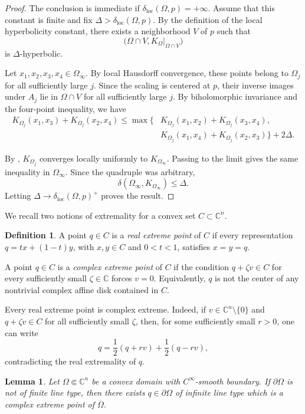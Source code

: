 \documentclass[11pt]{article}
\newtheorem{lemma}[theorem]{Lemma}
\theoremstyle{definition}
\newtheorem{definition}[theorem]{Definition}
\newcommand{\C}{\mathbb{C}}
\begin{document}
\begin{proof}
	The conclusion is immediate if
	\(\delta_{\mathrm{loc}}(\Omega,p)=+\infty\).
	Assume that this constant is finite and fix
	\(\Delta>\delta_{\mathrm{loc}}(\Omega,p)\).
	By the definition of the local hyperbolicity constant, there exists a
	neighborhood \(V\) of \(p\) such that
	\[
	\bigl(
	\Omega\cap V,
	\left.K_\Omega\right|_{\Omega\cap V}
	\bigr)
	\]
	is \(\Delta\)-hyperbolic.
	
	Let \(x_1,x_2,x_3,x_4\in\Omega_\infty\).  By local Hausdorff
	convergence, these points belong to \(\Omega_j\) for all sufficiently
	large \(j\).  Since the scaling is centered at \(p\), their inverse
	images under \(A_j\) lie in \(\Omega\cap V\) for all sufficiently large
	\(j\).  By biholomorphic invariance and the four-point inequality, we have
	\[
	\begin{aligned}
		K_{\Omega_j}(x_1,x_3)+K_{\Omega_j}(x_2,x_4)
		\le
		\max\bigl\{&
		K_{\Omega_j}(x_1,x_2)+K_{\Omega_j}(x_3,x_4),\\
		&
		K_{\Omega_j}(x_1,x_4)+K_{\Omega_j}(x_2,x_3)
		\bigr\}
		+2\Delta.
	\end{aligned}
	\]
	
	By \cite[Theorem~4.1]{ZimmerFiniteType},
	\(K_{\Omega_j}\) converges locally uniformly to
	\(K_{\Omega_\infty}\).  Passing to the limit gives the same
	inequality in \(\Omega_\infty\).  Since the quadruple was arbitrary,
	\[
	\delta(\Omega_\infty,K_{\Omega_\infty})
	\le
	\Delta.
	\]
	Letting
	\(\Delta\to\delta_{\mathrm{loc}}(\Omega,p)^+\)
	proves the result.
\end{proof}

We recall two notions of extremality for a convex set
\(C\subset\C^n\).

\begin{definition}
	A point \(q\in C\) is a \emph{real extreme point} of \(C\) if every
	representation \(q=tx+(1-t)y\), with \(x,y\in C\) and \(0<t<1\),
	satisfies \(x=y=q\).
	
	A point \(q\in C\) is a \emph{complex extreme point} of \(C\) if the
	condition \(q+\zeta v\in C\) for every sufficiently small
	\(\zeta\in\C\) forces \(v=0\).
	Equivalently, \(q\) is not the center of any nontrivial complex affine
	disk contained in \(C\).
\end{definition}

Every real extreme point is complex extreme.  Indeed, if
\(v\in\C^n\setminus\{0\}\) and
\(q+\zeta v\in C\) for all sufficiently small \(\zeta\), then, for some
sufficiently small \(r>0\), one can write
\[
q=\frac12(q+rv)+\frac12(q-rv),
\]
contradicting the real extremality of \(q\).
\begin{lemma}
	\label{lem:extreme-infinite-type-point}
	Let \(\Omega\Subset\C^n\) be a convex domain with \(C^\infty\)-smooth
	boundary.  If \(\partial\Omega\) is not of finite line type, then there
	exists \(q\in\partial\Omega\) of infinite line type which is a complex
	extreme point of \(\overline\Omega\).
\end{lemma}
\end{document}
